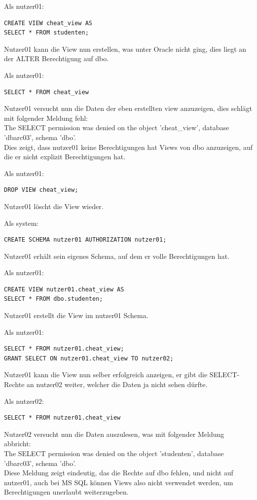 \documentclass[10pt]{scrreprt}
\begin{document}
Als nutzer01:
\begin{lstlisting}[style=sql]
CREATE VIEW cheat_view AS
SELECT * FROM studenten;
\end{lstlisting}
Nutzer01 kann die View nun erstellen, was unter Oracle nicht ging, dies liegt an der ALTER Berechtigung auf dbo.

Als nutzer01:
\begin{lstlisting}[style=sql]
SELECT * FROM cheat_view
\end{lstlisting}
Nutzer01 versucht nun die Daten der eben erstellten view anzuzeigen, dies schlägt mit folgender Meldung fehl:\\
The SELECT permission was denied on the object 'cheat\_view', database 'dbarc03', schema 'dbo'.\\
Dies zeigt, dass nutzer01 keine Berechtigungen hat Views von dbo anzuzeigen, auf die er nicht explizit Berechtigungen hat.

Als nutzer01:
\begin{lstlisting}[style=sql]
DROP VIEW cheat_view;
\end{lstlisting}
Nutzer01 löscht die View wieder.

Als system:
\begin{lstlisting}[style=sql]
CREATE SCHEMA nutzer01 AUTHORIZATION nutzer01;
\end{lstlisting}
Nutzer01 erhält sein eigenes Schema, auf dem er volle Berechtigungen hat.

Als nutzer01:
\begin{lstlisting}[style=sql]
CREATE VIEW nutzer01.cheat_view AS
SELECT * FROM dbo.studenten;
\end{lstlisting}
Nutzer01 erstellt die View im nutzer01 Schema.

Als nutzer01:
\begin{lstlisting}[style=sql]
SELECT * FROM nutzer01.cheat_view;
GRANT SELECT ON nutzer01.cheat_view TO nutzer02;
\end{lstlisting}
Nutzer01 kann die View nun selber erfolgreich anzeigen, er gibt die SELECT-Rechte an nutzer02 weiter, welcher die Daten ja nicht sehen dürfte.

Als nutzer02:
\begin{lstlisting}[style=sql]
SELECT * FROM nutzer01.cheat_view
\end{lstlisting}
Nutzer02 versucht nun die Daten auszulesen, was mit folgender Meldung abbricht:\\
The SELECT permission was denied on the object 'studenten', database 'dbarc03', schema 'dbo'.\\
Diese Meldung zeigt eindeutig, das die Rechte auf dbo fehlen, und nicht auf nutzer01, auch bei MS SQL können Views also nicht verwendet werden, um Berechtigungen unerlaubt weiterzugeben.
\end{document}
